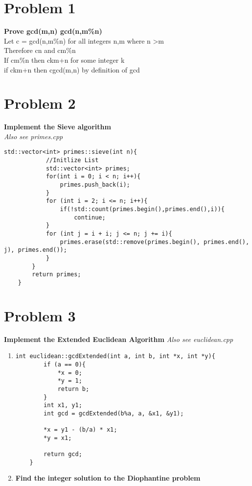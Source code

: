 \documentclass[12pt,letterpaper]{article}
\begin{document}
\section*{Problem 1}
\textbf{Prove gcd(m,n) \textbar{} gcd(n,m\%n)}\\

Let c = gcd(n,m\%n) for all integers n,m where n \textgreater m\\
Therefore c\textbar{}n and c\textbar{}m\%n\\
If c\textbar{}m\%n then c\textbar{}km+n for some integer k\\
if c\textbar{}km+n then c\textbar{}gcd(m,n) by definition of gcd

\section*{Problem 2}
\textbf{Implement the Sieve algorithm}\\
\textit{Also see primes.cpp}

     \begin{lstlisting}[style = C++]
        std::vector<int> primes::sieve(int n){
            //Initlize List
            std::vector<int> primes;
            for(int i = 0; i < n; i++){
                primes.push_back(i);
            }
            for (int i = 2; i <= n; i++){
                if(!std::count(primes.begin(),primes.end(),i)){
                    continue;
            }
            for (int j = i + i; j <= n; j += i){
                primes.erase(std::remove(primes.begin(), primes.end(), j), primes.end());
            }
        }
        return primes;
    }   
    \end{lstlisting}
\newpage

\section*{Problem 3}

\textbf{Implement the Extended Euclidean Algorithm}
\textit{Also see euclidean.cpp}
\begin{enumerate}
    \item 
     \begin{lstlisting}[style = C++]
    int euclidean::gcdExtended(int a, int b, int *x, int *y){  
        if (a == 0){  
            *x = 0;  
            *y = 1;  
            return b;  
        }  
        int x1, y1; 
        int gcd = gcdExtended(b%a, a, &x1, &y1);  
    
        *x = y1 - (b/a) * x1;  
        *y = x1;  
  
        return gcd;
    }
    \end{lstlisting}
    \item
    \textbf{Find the integer solution to the Diophantine problem}
    
        
\end{enumerate}
\end{document}
